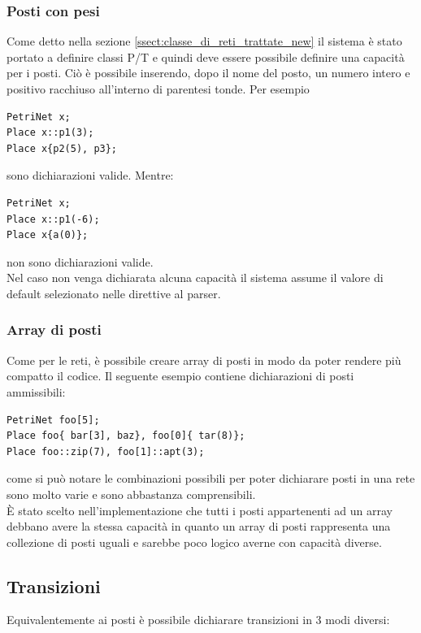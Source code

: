 \documentclass[italian,12pt]{book}
\begin{document}
\subsubsection{Posti con pesi}
Come detto nella sezione \ref{ssect:classe_di_reti_trattate_new} il sistema è stato portato a definire 
classi P/T e quindi deve essere possibile definire una capacità per i posti. Ciò è possibile inserendo, dopo il 
nome del posto, un numero intero e positivo racchiuso all'interno di parentesi tonde. Per esempio
\begin{verbatim}PetriNet x;
Place x::p1(3);
Place x{p2(5), p3};
\end{verbatim}
sono dichiarazioni valide. Mentre:
\begin{verbatim}PetriNet x;
Place x::p1(-6);
Place x{a(0)};
\end{verbatim}
non sono dichiarazioni valide.\\
Nel caso non venga dichiarata alcuna capacità il sistema assume il
valore di default selezionato nelle direttive al parser.

\subsubsection{Array di posti}
Come per le reti, è possibile creare array di posti in modo da poter rendere più compatto il codice.
Il seguente esempio contiene dichiarazioni di posti ammissibili:
\begin{verbatim}PetriNet foo[5];
Place foo{ bar[3], baz}, foo[0]{ tar(8)};
Place foo::zip(7), foo[1]::apt(3);
\end{verbatim}
come si può notare le combinazioni possibili per poter dichiarare posti in una rete sono molto varie
e sono abbastanza comprensibili.\\
È stato scelto nell'implementazione che tutti i posti appartenenti ad un array debbano avere la stessa capacità 
in quanto un array di posti rappresenta una collezione di posti uguali e sarebbe poco logico averne con capacità 
diverse.

\subsection{Transizioni}
Equivalentemente ai posti è possibile dichiarare transizioni in 3 modi diversi:
\end{document}
